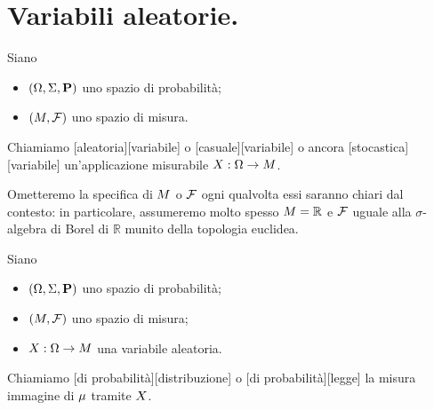 \section{Variabili aleatorie.}
\label{Probabilita_VariabiliAleatorie}
\begin{Definition}
  Siano
  \begin{itemize}
    \item $(\SamplesSpace,\Events,\Probability)$ uno spazio di
      probabilit\`a;
    \item $(M,\mathcal{F})$ uno spazio di misura.
  \end{itemize}
  Chiamiamo
  [aleatoria][variabile] o
  [casuale][variabile] o ancora
  [stocastica][variabile]
  un'applicazione misurabile
  $X: \Omega \rightarrow M$.
\end{Definition}
\par  Ometteremo la specifica di $M$ o $\mathcal{F}$ ogni
qualvolta essi saranno chiari dal contesto: in particolare, assumeremo molto
spesso
$M = \mathbb{R}$
e $\mathcal{F}$ uguale alla $\sigma$-algebra di Borel di $\mathbb{R}$ munito
della topologia euclidea.
\begin{Definition}
  Siano
  \begin{itemize}
    \item $(\SamplesSpace,\Events,\Probability)$ uno spazio di
      probabilit\`a;
    \item $(M,\mathcal{F})$ uno spazio di misura;
    \item $X: \Omega \rightarrow M$ una
      variabile aleatoria.
  \end{itemize}
  Chiamiamo
  [di probabilit\`a][distribuzione]
  o
  [di probabilit\`a][legge]
  la misura immagine di $\mu$ tramite $X$.
\end{Definition}
